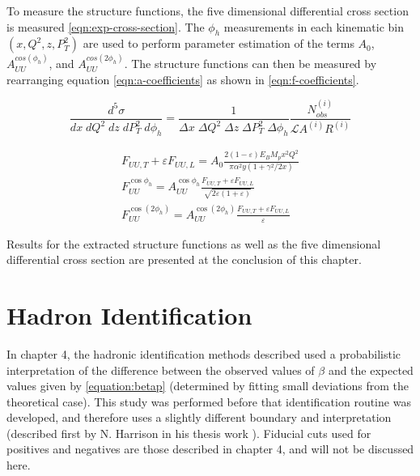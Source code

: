 To measure the structure functions, the five dimensional differential cross section is measured \ref{eqn:exp-cross-section}.  The $\phi_h$ measurements in each kinematic bin $(x, Q^2, z, P_T^2)$ are used to perform parameter estimation of the terms $A_{0}$, $A_{UU}^{cos(\phi_h)}$, and $A_{UU}^{cos(2\phi_h)}$.  The structure functions can then be measured by rearranging equation \ref{eqn:a-coefficients} as shown in \ref{eqn:f-coefficients}.

\begin{equation}
	\frac{d^5\sigma}{dx \; dQ^2 \; dz \; dP_T^2 \; d\phi_h} = \frac{1}{\Delta x \; \Delta Q^2 \; \Delta z \; \Delta P_T^2 \; \Delta \phi_h} \frac{N_{obs}^{(i)}}{\mathcal{L} A^{(i)} R^{(i)}} 
	\label{eqn:exp-cross-section}
\end{equation}

\begin{gather}
	\label{eqn:f-coefficients}
	F_{UU,T} + \varepsilon F_{UU,L} = A_0 \frac{2 (1-\varepsilon) E_B M_p x^2 Q^2}{\pi \alpha^2 y (1 + \gamma^2/2x)} \\
	F_{UU}^{\cos\phi_h} = A_{UU}^{\cos\phi_h}  \frac{ F_{UU,T} + \varepsilon F_{UU,L}}{\sqrt{2\varepsilon(1+\varepsilon)}} \\
	F_{UU}^{\cos(2\phi_h)} = A_{UU}^{\cos(2\phi_h)} \frac{ F_{UU,T} + \varepsilon F_{UU,L}}{\varepsilon}
\end{gather}

Results for the extracted structure functions as well as the five dimensional differential cross section are presented at the conclusion of this chapter.  

\section{Hadron Identification}
%
%
%	
%	

In chapter 4, the hadronic identification methods described used a probabilistic interpretation of the difference between the observed values of $\beta$ and the expected values given by \ref{equation:betap} (determined by fitting small deviations from the theoretical case).  This study was performed before that identification routine was developed, and therefore uses a slightly different boundary and interpretation (described first by N. Harrison in his thesis work \cite{theses-harrison:2015}).  Fiducial cuts used for positives and negatives are those described in chapter 4, and will not be discussed here.  \\

